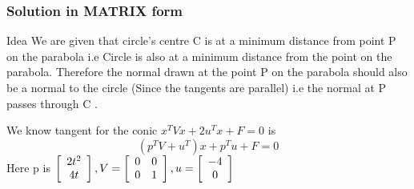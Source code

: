 \documentclass{beamer}
\begin{document}

\begin{frame}
\frametitle{Solution in MATRIX form}
\begin{block}{Idea}
We are given that circle's centre C is at a minimum distance from point P on the parabola i.e Circle is also at a minimum distance from the point on the parabola.
\newline
Therefore the normal drawn at the point P on the parabola should also be a normal to the circle (Since the tangents are parallel) i.e the normal at P passes through C .
\end{block}
We know tangent for the conic  $x^{T}Vx+2u^{T}x+F=0$ is $$(p^TV+u^T)x+p^Tu+F=0$$
Here p is $\left[
  \begin{array}{ c c }
     2t^2\\
     4t
  \end{array} \right],
V=\left[ 
  \begin{array}{ c c }
     0& 0\\
     0 & 1
  \end{array} \right],
  u= \left[ 
  \begin{array}{ c  }
     -4\\
     0
  \end{array} \right]$



\end{frame}
\end{document}
